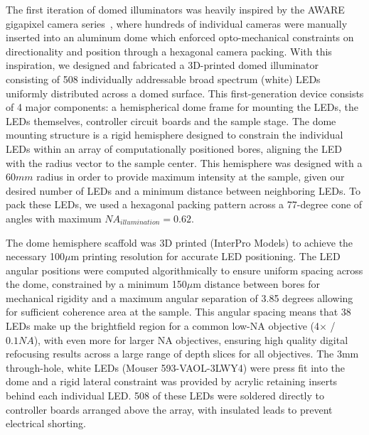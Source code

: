 The first iteration of domed illuminators was heavily inspired by the AWARE gigapixel camera series~\cite{brady2012multiscale, marks2014characterization, llull2015characterization}, where hundreds of individual cameras were manually inserted into an aluminum dome which enforced opto-mechanical constraints on directionality and position through a hexagonal camera packing. With this inspiration, we designed and fabricated a 3D-printed domed illuminator consisting of 508 individually addressable broad spectrum (white) LEDs uniformly distributed across a domed surface. This first-generation device consists of 4 major components: a hemispherical dome frame for mounting the LEDs, the LEDs themselves, controller circuit boards and the sample stage. The dome mounting structure is a rigid hemisphere designed to constrain the individual LEDs within an array of computationally positioned bores, aligning the LED with the radius vector to the sample center. This hemisphere was designed with a $60 mm$ radius in order to provide maximum intensity at the sample, given our desired number of LEDs and a minimum distance between neighboring LEDs. To pack these LEDs, we used a hexagonal packing pattern across a 77-degree cone of angles with maximum $NA_{illumination} = 0.62$.

The dome hemisphere scaffold was 3D printed (InterPro Models) to achieve the necessary 100$\mu$m printing resolution for accurate LED positioning. The LED angular positions were computed algorithmically to ensure uniform spacing across the dome, constrained by a minimum 150$\mu$m distance between bores for mechanical rigidity and a maximum angular separation of 3.85 degrees allowing for sufficient coherence area at the sample. This angular spacing means that 38 LEDs make up the brightfield region for a common low-NA objective (4$\times$ / $0.1 NA$), with even more for larger NA objectives, ensuring high quality digital refocusing results across a large range of depth slices for all objectives. The $3\textrm{mm}$ through-hole, white LEDs (Mouser 593-VAOL-3LWY4) were press fit into the dome and a rigid lateral constraint was provided by acrylic retaining inserts behind each individual LED. 508 of these LEDs were soldered directly to controller boards arranged above the array, with insulated leads to prevent electrical shorting.

